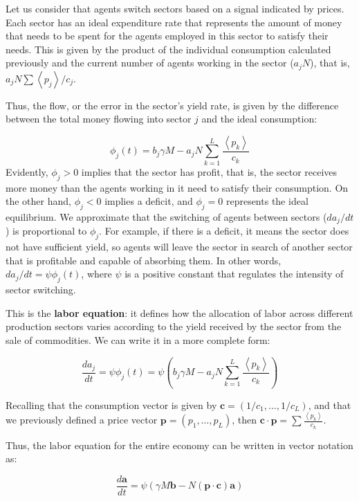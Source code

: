 Let us consider that agents switch sectors based on a signal indicated by prices. Each sector has an ideal expenditure rate that represents the amount of money that needs to be spent for the agents employed in this sector to satisfy their needs. This is given by the product of the individual consumption calculated previously and the current number of agents working in the sector ($a_j N$), that is, $a_j N \sum\left\langle p_{j}\right\rangle /c_{j}$.

Thus, the flow, or the error in the sector’s yield rate, is given by the difference between the total money flowing into sector $j$ and the ideal consumption:


$$\phi_{j}\left(t\right)=b_{j}\gamma M-a_{j}N\sum_{k=1}^{L}\frac{\left\langle p_{k}\right\rangle} {c_{k}}$$
Evidently, $\phi_{j}>0$ implies that the sector has profit, that is, the sector receives more money than the agents working in it need to satisfy their consumption. On the other hand, $\phi_{j} < 0$ implies a deficit, and $\phi_{j}=0$ represents the ideal equilibrium. We approximate that the switching of agents between sectors ($da_j/dt$) is proportional to $\phi_{j}$. For example, if there is a deficit, it means the sector does not have sufficient yield, so agents will leave the sector in search of another sector that is profitable and capable of absorbing them. In other words, $da_j/dt=\psi \phi_j(t)$, where $\psi$ is a positive constant that regulates the intensity of sector switching.

This is the \textbf{labor equation}: it defines how the allocation of labor across different production sectors varies according to the yield received by the sector from the sale of commodities. We can write it in a more complete form:


$$\frac{da_{j}}{dt}=\psi\phi_{j}\left(t\right)=\psi\left(b_{j}\gamma M-a_{j}N\sum_{k=1}^{L}\frac{\left\langle p_{k}\right\rangle}{c_{k}}\right)$$

Recalling that the consumption vector is given by $\boldsymbol{c}=(1/c_{1},\ldots,1/c_{L})$, and that we previously defined a price vector $\boldsymbol{p}=(p_{1},\ldots,p_{L})$, then $\boldsymbol{c}\cdot\boldsymbol{p}=\sum\frac{\left\langle p_{k}\right\rangle }{c_{k}}$.

Thus, the labor equation for the entire economy can be written in vector notation as:


$$\frac{d\boldsymbol{a}}{dt}=\psi\left(\gamma M\boldsymbol{b}-N\left(\boldsymbol{p}\cdot\boldsymbol{c}\right)\boldsymbol{a}\right)$$

